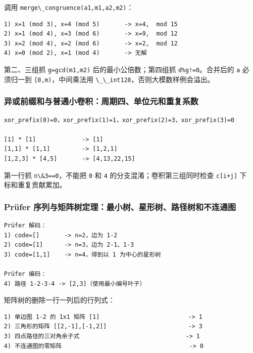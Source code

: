 调用 \passthrough{\lstinline!merge\_congruence(a1,m1,a2,m2)!}：

\begin{lstlisting}
1) x=1 (mod 3), x=4 (mod 5)       -> x=4,  mod 15
2) x=1 (mod 4), x=3 (mod 6)       -> x=9,  mod 12
3) x=2 (mod 4), x=2 (mod 6)       -> x=2,  mod 12
4) x=0 (mod 2), x=1 (mod 4)       -> 无解
\end{lstlisting}

第二、三组抓 \passthrough{\lstinline!g=gcd(m1,m2)!} 后的最小公倍数；第四组抓 \passthrough{\lstinline"d\%g!=0"}。合并后的 \passthrough{\lstinline!a!} 必须归一到 \passthrough{\lstinline![0,m)!}，中间乘法用 \passthrough{\lstinline!\_\_int128!}，否则大模数样例会溢出。

\subsubsection{异或前缀和与普通小卷积：周期四、单位元和重复系数}

\begin{lstlisting}
xor_prefix(0)=0，xor_prefix(1)=1，xor_prefix(2)=3，xor_prefix(3)=0

[1] * [1]             -> [1]
[1,1] * [1,1]         -> [1,2,1]
[1,2,3] * [4,5]       -> [4,13,22,15]
\end{lstlisting}

第一行抓 \passthrough{\lstinline!n\&3==0!}，不能把 \passthrough{\lstinline!0!} 和 \passthrough{\lstinline!4!} 的分支混淆；卷积第三组同时检查 \passthrough{\lstinline!c[i+j]!} 下标和重复贡献累加。

\subsubsection{Prüfer 序列与矩阵树定理：最小树、星形树、路径树和不连通图}

\begin{lstlisting}
Prüfer 解码：
1) code=[]       -> n=2，边为 1-2
2) code=[1]      -> n=3，边为 2-1、1-3
3) code=[1,1]    -> n=4，得到以 1 为中心的星形树

Prüfer 编码：
4) 路径 1-2-3-4 -> [2,3]（使用最小编号叶子）
\end{lstlisting}

矩阵树的删除一行一列后的行列式：

\begin{lstlisting}
1) 单边图 1-2 的 1x1 矩阵 [1]                         -> 1
2) 三角形的矩阵 [[2,-1],[-1,2]]                       -> 3
3) 四点路径的三对角余子式                              -> 1
4) 不连通图的零矩阵                                    -> 0
\end{lstlisting}

